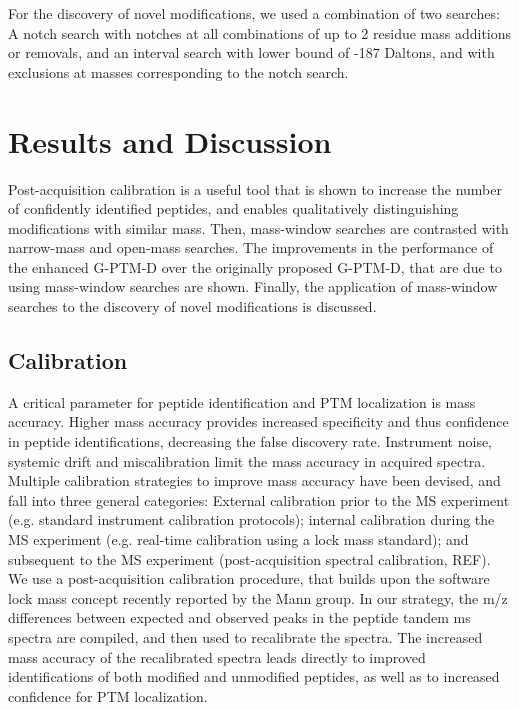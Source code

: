 \documentclass[journal=jprobs,manuscript=article]{achemso}
\begin{document}
For the discovery of novel modifications, we used a combination of two searches: A notch search with notches at all combinations of up to 2 residue mass additions or removals, and an interval search with lower bound of -187 Daltons, and with exclusions at masses corresponding to the notch search.

\section{Results and Discussion}

Post-acquisition calibration is a useful tool that is shown to increase the number of confidently identified peptides, and enables qualitatively distinguishing modifications with similar mass.
Then, mass-window searches are contrasted with narrow-mass and open-mass searches.
The improvements in the performance of the enhanced G-PTM-D over the originally proposed G-PTM-D, that are due to using mass-window searches are shown.
Finally, the application of mass-window searches to the discovery of novel modifications is discussed.

\subsection{Calibration}

A critical parameter for peptide identification and PTM localization is mass accuracy\cite{Scherl_2008}.
Higher mass accuracy provides increased specificity and thus confidence in peptide identifications, decreasing the false discovery rate.
Instrument noise, systemic drift and miscalibration limit the mass accuracy in acquired spectra.
Multiple calibration strategies to improve mass accuracy have been devised, and fall into three general categories:  External calibration prior to the MS experiment (e.g. standard instrument calibration protocols); internal calibration during the MS experiment (e.g. real-time calibration using a lock mass standard\cite{Olsen_2005}); and subsequent to the MS experiment (post-acquisition spectral calibration, REF).
We use a post-acquisition calibration procedure, that builds upon the software lock mass concept\cite{Cox_2011} recently reported by the Mann group.
In our strategy, the m/z differences between expected and observed peaks in the peptide tandem ms spectra are compiled, and then used to recalibrate the spectra.
The increased mass accuracy of the recalibrated spectra leads directly to improved identifications of both modified and unmodified peptides, as well as to increased confidence for PTM localization.
\end{document}
